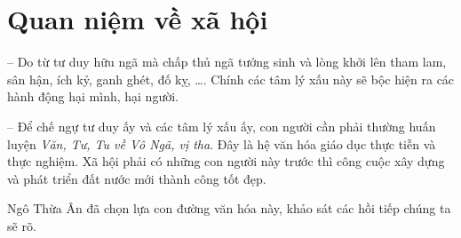 \section{Quan niệm về xã hội} %
\label{sec:23_xa_hoi}

-- Do từ tư duy hữu ngã mà chấp thủ ngã tướng sinh và lòng khởi lên tham lam, sân hận, ích kỷ, ganh ghét, đố kỵ, \ldots. Chính các tâm lý xấu này sẽ bộc hiện ra các hành động hại mình, hại người.

-- Để chế ngự tư duy ấy và các tâm lý xấu ấy, con người cần phải thường huấn luyện \emph{Văn, Tư, Tu về Vô Ngã, vị tha}. Đây là hệ văn hóa giáo dục thực tiễn và thực nghiệm. Xã hội phải có những con người này trước thì công cuộc xây dựng và phát triển đất nước mới thành công tốt đẹp.

Ngô Thừa Ân đã chọn lựa con đường văn hóa này, khảo sát các hồi tiếp chúng ta sẽ rõ.
